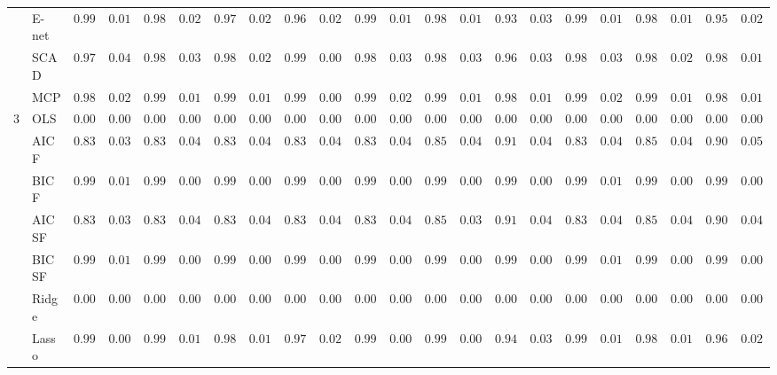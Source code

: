 \begin{tabular}{ll|ll|llllll|llllll|llllll}
 & E-net  & $0.9943$ & $0.0145$ & $0.9874$ & $0.0214$ & $0.9788$ & $0.0236$ & $0.9655$ & $0.0259$ & $0.9944$ & $0.0126$ & $0.9885$ & $0.0191$ & $0.9329$ & $0.0330$ & $0.9919$ & $0.0130$ & $0.9842$ & $0.0188$ & $0.9595$ & $0.0238$ \\
 & SCAD  & $0.9791$ & $0.0413$ & $0.9829$ & $0.0335$ & $0.9875$ & $0.0261$ & $0.9972$ & $0.0091$ & $0.9834$ & $0.0384$ & $0.9832$ & $0.0364$ & $0.9693$ & $0.0306$ & $0.9825$ & $0.0328$ & $0.9851$ & $0.0267$ & $0.9805$ & $0.0172$ \\
 & MCP  & $0.9898$ & $0.0211$ & $0.9920$ & $0.0165$ & $0.9941$ & $0.0178$ & $0.9977$ & $0.0083$ & $0.9916$ & $0.0223$ & $0.9922$ & $0.0189$ & $0.9844$ & $0.0165$ & $0.9908$ & $0.0203$ & $0.9956$ & $0.0101$ & $0.9876$ & $0.0140$ \\\hline
3 & OLS  & $0.0000$ & $0.0000$ & $0.0000$ & $0.0000$ & $0.0000$ & $0.0000$ & $0.0000$ & $0.0000$ & $0.0000$ & $0.0000$ & $0.0000$ & $0.0000$ & $0.0000$ & $0.0000$ & $0.0000$ & $0.0000$ & $0.0000$ & $0.0000$ & $0.0000$ & $0.0000$ \\
 & AIC F  & $0.8329$ & $0.0391$ & $0.8353$ & $0.0419$ & $0.8341$ & $0.0421$ & $0.8306$ & $0.0481$ & $0.8366$ & $0.0447$ & $0.8506$ & $0.0408$ & $0.9124$ & $0.0434$ & $0.8367$ & $0.0438$ & $0.8538$ & $0.0428$ & $0.9071$ & $0.0505$ \\
 & BIC F  & $0.9905$ & $0.0112$ & $0.9928$ & $0.0099$ & $0.9919$ & $0.0087$ & $0.9922$ & $0.0088$ & $0.9906$ & $0.0098$ & $0.9932$ & $0.0076$ & $0.9960$ & $0.0061$ & $0.9901$ & $0.0103$ & $0.9929$ & $0.0087$ & $0.9967$ & $0.0071$ \\
 & AIC SF  & $0.8334$ & $0.0389$ & $0.8364$ & $0.0413$ & $0.8354$ & $0.0403$ & $0.8316$ & $0.0474$ & $0.8377$ & $0.0436$ & $0.8530$ & $0.0397$ & $0.9152$ & $0.0421$ & $0.8390$ & $0.0416$ & $0.8548$ & $0.0421$ & $0.9080$ & $0.0494$ \\
 & BIC SF  & $0.9905$ & $0.0112$ & $0.9928$ & $0.0099$ & $0.9919$ & $0.0087$ & $0.9922$ & $0.0088$ & $0.9906$ & $0.0098$ & $0.9932$ & $0.0076$ & $0.9960$ & $0.0061$ & $0.9902$ & $0.0100$ & $0.9929$ & $0.0087$ & $0.9967$ & $0.0071$ \\
 & Ridge  & $0.0000$ & $0.0000$ & $0.0000$ & $0.0000$ & $0.0000$ & $0.0000$ & $0.0000$ & $0.0000$ & $0.0000$ & $0.0000$ & $0.0000$ & $0.0000$ & $0.0000$ & $0.0000$ & $0.0000$ & $0.0000$ & $0.0000$ & $0.0000$ & $0.0000$ & $0.0000$ \\
 & Lasso  & $0.9969$ & $0.0087$ & $0.9936$ & $0.0141$ & $0.9882$ & $0.0161$ & $0.9788$ & $0.0243$ & $0.9960$ & $0.0086$ & $0.9954$ & $0.0089$ & $0.9436$ & $0.0320$ & $0.9943$ & $0.0129$ & $0.9874$ & $0.0174$ & $0.9696$ & $0.0209$ \\

\end{tabular}

